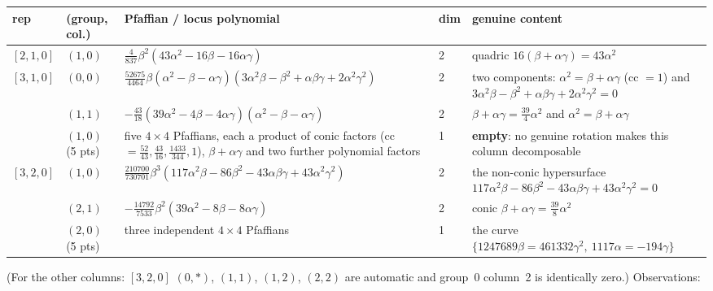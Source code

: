 \documentclass[10pt]{article}
\begin{document}
\begin{center}\footnotesize\setlength{\tabcolsep}{3pt}\begin{longtable}{@{}p{1.5cm}p{1.3cm}p{6.3cm}p{1.1cm}p{5.2cm}@{}}\toprule
\textbf{rep} & \textbf{(group, col.)} & \textbf{Pfaffian / locus polynomial} & \textbf{dim} & \textbf{genuine content} \\\midrule\endhead
$[2,1,0]$ & $(1,0)$ & $\tfrac4{837}\beta^2(43\alpha^2-16\beta-16\alpha\gamma)$ & 2 & quadric $16(\beta+\alpha\gamma)=43\alpha^2$ \\
$[3,1,0]$ & $(0,0)$ & $\tfrac{52675}{4464}\beta(\alpha^2-\beta-\alpha\gamma)(3\alpha^2\beta-\beta^2+\alpha\beta\gamma+2\alpha^2\gamma^2)$ & 2 & two components: $\alpha^2=\beta+\alpha\gamma$ (cc $=1$) and $3\alpha^2\beta-\beta^2+\alpha\beta\gamma+2\alpha^2\gamma^2=0$ \\
 & $(1,1)$ & $-\tfrac{43}{18}(39\alpha^2-4\beta-4\alpha\gamma)(\alpha^2-\beta-\alpha\gamma)$ & 2 & $\beta+\alpha\gamma=\tfrac{39}4\alpha^2$ and $\alpha^2=\beta+\alpha\gamma$ \\
 & $(1,0)$ (5 pts) & five $4\times4$ Pfaffians, each a product of conic factors (cc $=\tfrac{52}{43},\tfrac{43}{16},\tfrac{1433}{344},1$), $\beta+\alpha\gamma$ and two further polynomial factors & 1 & \textbf{empty}: no genuine rotation makes this column decomposable \\
$[3,2,0]$ & $(1,0)$ & $\tfrac{210700}{730701}\beta^3(117\alpha^2\beta-86\beta^2-43\alpha\beta\gamma+43\alpha^2\gamma^2)$ & 2 & the non-conic hypersurface $117\alpha^2\beta-86\beta^2-43\alpha\beta\gamma+43\alpha^2\gamma^2=0$ \\
 & $(2,1)$ & $-\tfrac{14792}{7533}\beta^2(39\alpha^2-8\beta-8\alpha\gamma)$ & 2 & conic $\beta+\alpha\gamma=\tfrac{39}8\alpha^2$ \\
 & $(2,0)$ (5 pts) & three independent $4\times4$ Pfaffians & 1 & the curve $\{1247689\beta=461332\gamma^2,\ 1117\alpha=-194\gamma\}$ \\
\bottomrule\end{longtable}\end{center}
(For the other columns: $[3,2,0]$ $(0,\ast)$, $(1,1)$, $(1,2)$, $(2,2)$ are automatic and group~0 column~2 is identically zero.) Observations:
\end{document}
